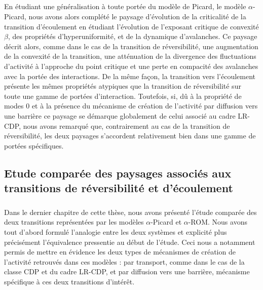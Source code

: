 \subparagraph{}En étudiant une généralisation à toute portée du modèle de Picard, le modèle $\alpha$-Picard, nous avons alors complété le paysage d'évolution de la criticalité de la transition d'écoulement en étudiant l'évolution de l'exposant critique de convexité $\beta$, des propriétés d'hyperuniformité, et de la dynamique d'avalanches. Ce paysage décrit alors, comme dans le cas de la transition de réversibilité, une augmentation de la convexité de la transition, une atténuation de la divergence des fluctuations d'activité à l'approche du point critique et une perte en compacité des avalanches avec la portée des interactions. De la même façon, la transition vers l'écoulement présente les mêmes propriétés atypiques que la transition de réversibilité sur toute une gamme de portées d'interaction.  Toutefois, si, dû à la propriété de modes 0 et à la présence du mécanisme de création de l'activité par diffusion vers une barrière ce paysage se démarque globalement de celui associé au cadre LR-CDP, nous avons remarqué que, contrairement au cas de la transition de réversibilité, les deux paysages s'accordent relativement bien dans une gamme de portées spécifiques.

\subsection*{Etude comparée des paysages associés aux transitions de réversibilité et d'écoulement}

\subparagraph{}Dans le dernier chapitre de cette thèse, nous avons présenté l'étude comparée des deux transitions représentées par les modèles $\alpha$-Picard et $\alpha$-ROM. Nous avons tout d'abord formulé l'analogie entre les deux systèmes et explicité plus précisément l'équivalence pressentie au début de l'étude. Ceci nous a notamment permis de mettre en évidence les deux types de mécanismes de création de l'activité retrouvés dans ces modèles : par transport, comme dans le cas de la classe CDP et du cadre LR-CDP, et par diffusion vers une barrière, mécanisme spécifique à ces deux transitions d'intérêt.

